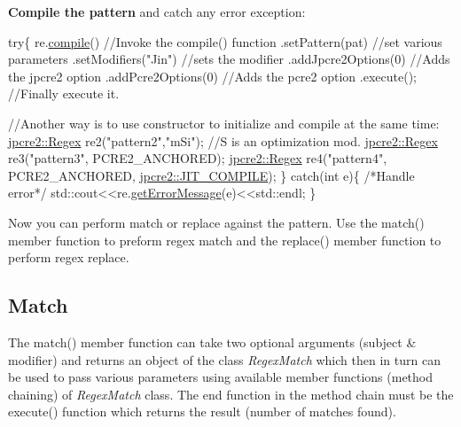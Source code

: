{\bfseries Compile the pattern} and catch any error exception\+:


\begin{DoxyCode}
\textcolor{keywordflow}{try}\{
    re.\hyperlink{classjpcre2_1_1Regex_aad1d5ef1e87f762f68a587eec4022e69}{compile}()               \textcolor{comment}{//Invoke the compile() function}
      .setPattern(pat)         \textcolor{comment}{//set various parameters}
      .setModifiers(\textcolor{stringliteral}{"Jin"})     \textcolor{comment}{//sets the modifier}
      .addJpcre2Options(0)     \textcolor{comment}{//Adds the jpcre2 option}
      .addPcre2Options(0)      \textcolor{comment}{//Adds the pcre2 option}
      .execute();              \textcolor{comment}{//Finally execute it.}

    \textcolor{comment}{//Another way is to use constructor to initialize and compile at the same time:}
    \hyperlink{classjpcre2_1_1Regex}{jpcre2::Regex} re2(\textcolor{stringliteral}{"pattern2"},\textcolor{stringliteral}{"mSi"});  \textcolor{comment}{//S is an optimization mod.}
    \hyperlink{classjpcre2_1_1Regex}{jpcre2::Regex} re3(\textcolor{stringliteral}{"pattern3"}, PCRE2\_ANCHORED);
    \hyperlink{classjpcre2_1_1Regex}{jpcre2::Regex} re4(\textcolor{stringliteral}{"pattern4"}, PCRE2\_ANCHORED, 
      \hyperlink{namespacejpcre2_a85c143271501e383843f45b9999c2f00a5e8bab7c478015b19baf3e84ed00876e}{jpcre2::JIT\_COMPILE});
\}
\textcolor{keywordflow}{catch}(\textcolor{keywordtype}{int} e)\{
    \textcolor{comment}{/*Handle error*/}
    std::cout<<re.\hyperlink{classjpcre2_1_1Regex_a92b75c438ccff871205b2175a6141fd5}{getErrorMessage}(e)<<std::endl;
\}
\end{DoxyCode}


Now you can perform match or replace against the pattern. Use the {\ttfamily match()} member function to preform regex match and the {\ttfamily replace()} member function to perform regex replace.

 \subsection*{Match}

The {\ttfamily match()} member function can take two optional arguments (subject \& modifier) and returns an object of the class {\itshape Regex\+Match} which then in turn can be used to pass various parameters using available member functions (method chaining) of {\itshape Regex\+Match} class. The end function in the method chain must be the {\ttfamily execute()} function which returns the result (number of matches found).


